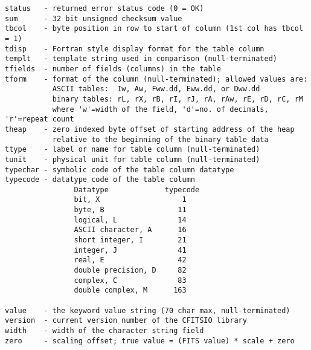\begin{verbatim}
status   - returned error status code (0 = OK)
sum      - 32 bit unsigned checksum value
tbcol    - byte position in row to start of column (1st col has tbcol = 1)
tdisp    - Fortran style display format for the table column
templt   - template string used in comparison (null-terminated)
tfields  - number of fields (columns) in the table
tform    - format of the column (null-terminated); allowed values are:
           ASCII tables:  Iw, Aw, Fww.dd, Eww.dd, or Dww.dd
           binary tables: rL, rX, rB, rI, rJ, rA, rAw, rE, rD, rC, rM
           where 'w'=width of the field, 'd'=no. of decimals, 'r'=repeat count
theap    - zero indexed byte offset of starting address of the heap
           relative to the beginning of the binary table data
ttype    - label or name for table column (null-terminated)
tunit    - physical unit for table column (null-terminated)
typechar - symbolic code of the table column datatype
typecode - datatype code of the table column
                Datatype             typecode
                bit, X                   1
                byte, B                 11
                logical, L              14
                ASCII character, A      16
                short integer, I        21
                integer, J              41
                real, E                 42
                double precision, D     82
                complex, C              83
                double complex, M      163

value    - the keyword value string (70 char max, null-terminated)
version  - current version number of the CFITSIO library
width    - width of the character string field
zero     - scaling offset; true value = (FITS value) * scale + zero
\end{verbatim}
%

